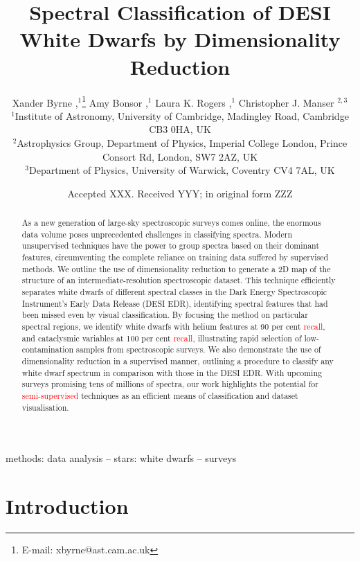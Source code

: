 \documentclass[fleqn,usenatbib]{mnras}
\title[
    \red{Semi-supervised} WD Spectral Classification
]{
    \red{Semi-supervised} Spectral Classification of DESI White Dwarfs by Dimensionality Reduction
}
\author[
    X. Byrne et al.
]{
    Xander Byrne
    \orcidlink{0000-0001-9488-238X},$^{1}$\thanks{E-mail: xbyrne@ast.cam.ac.uk}
    Amy Bonsor
    \orcidlink{0000-0002-8070-1901},$^{1}$
    Laura K. Rogers
    \orcidlink{0000-0002-3553-9474},$^{1}$
    Christopher J. Manser
    \orcidlink{0000-0003-1543-5405}$^{2,3}$
\\
$^{1}$Institute of Astronomy,
University of Cambridge,
Madingley Road,
Cambridge CB3 0HA,
UK\\
$^{2}$Astrophysics Group,
Department of Physics,
Imperial College London,
Prince Consort Rd,
London,
SW7 2AZ,
UK\\
$^{3}$Department of Physics,
University of Warwick,
Coventry CV4 7AL,
UK
}
\date{Accepted XXX. Received YYY; in original form ZZZ}
\newcommand{\red}[1]{\textcolor{red}{#1}}
\begin{document}
\label{firstpage}
\pagerange{\pageref{firstpage}--\pageref{lastpage}}
\maketitle

\begin{abstract}
As a new generation of large-sky spectroscopic surveys comes online, the enormous data volume poses unprecedented challenges in classifying spectra. 
Modern unsupervised techniques have the power to group spectra based on their dominant features, circumventing the complete reliance on training data suffered by supervised methods.
We outline the use of dimensionality reduction to generate a 2D map of the structure of an intermediate-resolution spectroscopic dataset.
This technique efficiently separates white dwarfs of different spectral classes in the Dark Energy Spectroscopic Instrument's Early Data Release (DESI EDR), identifying spectral features that had been missed even by visual classification.
By focusing the method on particular spectral regions, we identify white dwarfs with helium features at 90 per cent \red{recall}, and cataclysmic variables at 100 per cent \red{recall}, illustrating rapid selection of low-contamination samples from spectroscopic surveys.
We also demonstrate the use of dimensionality reduction in a supervised manner, outlining a procedure to classify any white dwarf spectrum in comparison with those in the DESI EDR.
With upcoming surveys promising tens of millions of spectra, our work highlights the potential for \red{semi-supervised} techniques as an efficient means of classification and dataset visualisation.
\end{abstract}

\begin{keywords}
methods: data analysis -- stars: white dwarfs -- surveys
\end{keywords}



\section{Introduction}
\end{document}
